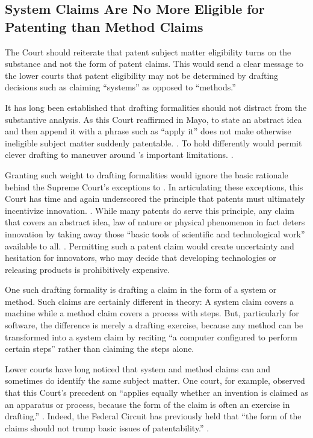 \documentclass{scotus}
\begin{document}
%
%
\subsection{System Claims Are No More Eligible for Patenting than Method Claims}

The Court should reiterate that patent subject matter eligibility turns on the
substance and not the form of patent claims.  This would send a clear message to
the lower courts that patent eligibility may not be determined by drafting
decisions such as claiming “systems” as opposed to “methods.” 

It has long been established that drafting formalities should not distract from
the substantive  analysis.  As this Court reaffirmed in Mayo, to
state an abstract idea and then append it with a phrase such as “apply it” does
not make otherwise ineligible subject matter suddenly patentable. .  To hold differently would permit clever drafting to maneuver around
's important limitations. .

Granting such weight to drafting formalities would ignore the basic rationale
behind the Supreme Court’s exceptions to .  In articulating these
exceptions, this Court has time and again underscored the principle that patents
must ultimately incentivize innovation. . While many patents do serve this principle, any claim that
covers an abstract idea, law of nature or physical phenomenon in fact deters
innovation by taking away those “basic tools of scientific and technological
work”  available to all. . Permitting such a patent claim
would create uncertainty and hesitation for innovators, who may decide
that developing technologies or releasing products is prohibitively
expensive.

One such drafting formality is drafting a claim in the form of a system or
method.  Such claims are certainly different in theory: A system claim covers a
machine while a method claim covers a process with steps. But, particularly for
software, the difference is merely a drafting exercise, because any method can
be transformed into a system claim by reciting “a computer configured to perform
certain steps” rather than claiming the steps alone. 

Lower courts have long noticed that system and method claims can and sometimes
do identify the same subject matter.  One court, for example, observed
that this Court's precedent on  ``applies equally whether an
invention is claimed as an apparatus or process, because the form of the claim
is often an exercise in drafting.'' . Indeed, the Federal Circuit has previously held
that ``the form of the claims should not trump basic issues of patentability.''
.
\end{document}
